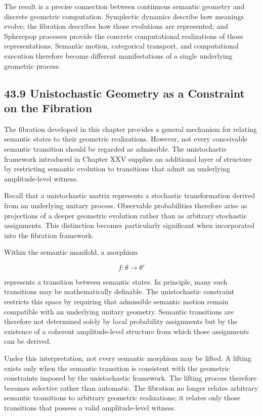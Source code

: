 \documentclass[12pt,letterpaper]{article}
\theoremstyle{remark}
\begin{document}
The result is a precise connection between continuous semantic geometry and discrete geometric computation. Symplectic dynamics describe how meanings evolve; the fibration describes how those evolutions are represented; and Spherepop processes provide the concrete computational realizations of those representations. Semantic motion, categorical transport, and computational execution therefore become different manifestations of a single underlying geometric process.

\subsection{43.9 Unistochastic Geometry as a Constraint on the Fibration}

The fibration developed in this chapter provides a general mechanism for relating semantic states to their geometric realizations. However, not every conceivable semantic transition should be regarded as admissible. The unistochastic framework introduced in Chapter XXV supplies an additional layer of structure by restricting semantic evolution to transitions that admit an underlying amplitude-level witness.

Recall that a unistochastic matrix represents a stochastic transformation derived from an underlying unitary process. Observable probabilities therefore arise as projections of a deeper geometric evolution rather than as arbitrary stochastic assignments. This distinction becomes particularly significant when incorporated into the fibration framework.

Within the semantic manifold, a morphism

\[
f : \theta \to \theta'
\]

represents a transition between semantic states. In principle, many such transitions may be mathematically definable. The unistochastic constraint restricts this space by requiring that admissible semantic motion remain compatible with an underlying unitary geometry. Semantic transitions are therefore not determined solely by local probability assignments but by the existence of a coherent amplitude-level structure from which those assignments can be derived.

Under this interpretation, not every semantic morphism may be lifted. A lifting exists only when the semantic transition is consistent with the geometric constraints imposed by the unistochastic framework. The lifting process therefore becomes selective rather than automatic. The fibration no longer relates arbitrary semantic transitions to arbitrary geometric realizations; it relates only those transitions that possess a valid amplitude-level witness.
\end{document}
